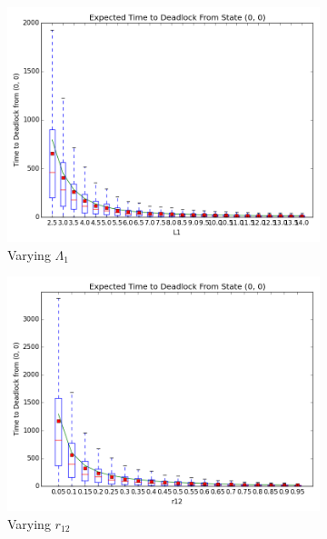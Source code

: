 \documentclass{article}
\begin{document}
\begin{figure}[H]
\begin{subfigure}[b]{0.5\textwidth}
  \includegraphics[width=\textwidth]{images/varyL1}
  \caption{Varying $\Lambda_1$}
  \label{fig:timestodeadlock2_L1}
\end{subfigure}
\begin{subfigure}[b]{0.5\textwidth}
  \includegraphics[width=\textwidth]{images/varyr12}
  \caption{Varying $r_{12}$}
  \label{fig:timestodeadlock2_r12}
\end{subfigure}
\begin{subfigure}[b]{0.5\textwidth}

\end{subfigure}
\end{figure}
\end{document}
